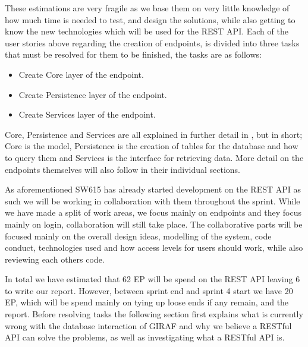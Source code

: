 These estimations are very fragile as we base them on very little knowledge of how much time is needed to test, and design the solutions, while also getting to know the new technologies which will be used for the REST API.
Each of the user stories above regarding the creation of endpoints, is divided into three tasks that must be resolved for them to be finished, the tasks are as follows:
\begin{itemize}
    \item Create Core layer of the endpoint.
    \item Create Persistence layer of the endpoint.
    \item Create Services layer of the endpoint.
\end{itemize}
Core, Persistence and Services are all explained in further detail in , but in short; Core is the model, Persistence is the creation of tables for the database and how to query them and Services is the interface for retrieving data.
More detail on the endpoints themselves will also follow in their individual sections.

As aforementioned SW615 has already started development on the REST API as such we will be working in collaboration with them throughout the sprint.
While we have made a split of work areas, we focus mainly on endpoints and they focus mainly on login, collaboration will still take place.
The collaborative parts will be focused mainly on the overall design ideas, modelling of the system, code conduct, technologies used and how access levels for users should work, while also reviewing each others code.

In total we have estimated that 62 EP will be spend on the REST API leaving 6 to write our report.
However, between sprint end and sprint 4 start we have 20 EP, which will be spend mainly on tying up loose ends if any remain, and the report.
Before resolving tasks the following section first explains what is currently wrong with the database interaction of GIRAF and why we believe a RESTful API can solve the problems, as well as investigating what a RESTful API is.
